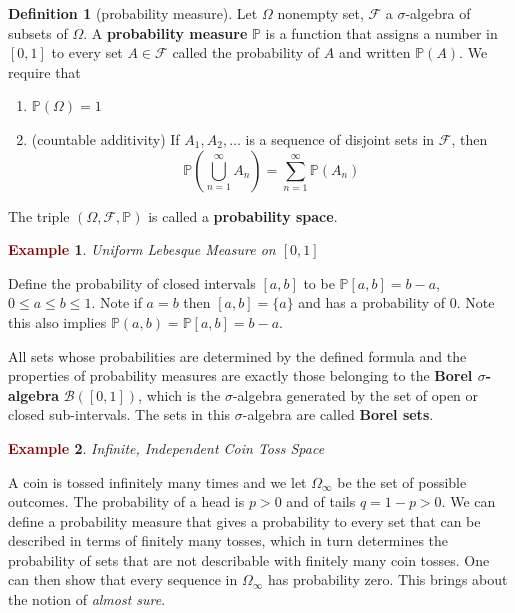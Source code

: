 \documentclass[11pt]{article}
\theoremstyle{definition}
\theoremstyle{definition}
\theoremstyle{definition}
\newtheorem{definition}{\textcolor{OliveGreen}{Definition}}
\newtheorem{ex}{\textcolor{Maroon}{Example}}
\theoremstyle{remark}
\begin{document}
\begin{definition}[probability measure]
    Let $\Omega$ nonempty set, $\mathcal{F}$ a $\sigma$-algebra of subsets of $\Omega$. A \textbf{probability measure} $\mathbb{P}$
    is a function that assigns a number in $[0, 1]$ to every set $A \in \mathcal{F}$ called the probability of 
    $A$ and written $\mathbb{P}(A)$. We require that
    \begin{enumerate}
        \item $\mathbb{P}(\Omega) = 1$
        \item (countable additivity) If $A_1, A_2, \dots$ is a sequence of disjoint sets in $\mathcal{F}$, then
        \[
            \mathbb{P}\left(\bigcup_{n = 1}^\infty A_n\right) = \sum_{n = 1}^\infty \mathbb{P}(A_n)
        \]    
    \end{enumerate}
    The triple $(\Omega, \mathcal{F}, \mathbb{P})$ is called a \textbf{probability space}. 
\end{definition}

\begin{ex}{\textit{Uniform Lebesque Measure on $[0, 1]$}}
    
    Define the probability of closed intervals $[a,b]$ to be $\mathbb{P}[a,b] = b - a$, $0 \leq a \leq b \leq 1$.
    Note if $a = b$ then $[a, b] = \{a\}$ and has a probability of $0$. Note this also implies 
    $\mathbb{P}(a, b) = \mathbb{P}[a,b] = b - a$. 

    All sets whose probabilities are determined by the defined formula and the properties of probability measures are exactly those
    belonging to the \textbf{Borel $\sigma$-algebra} $\mathcal{B}([0, 1])$, which is the $\sigma$-algebra generated by the set of open or closed sub-intervals. 
    The sets in this $\sigma$-algebra are called \textbf{Borel sets}.
\end{ex}

\begin{ex}{\textit{Infinite, Independent Coin Toss Space}}

    A coin is tossed infinitely many times and we let $\Omega_{\infty}$ be the set of possible outcomes. The probability
    of a head is $p > 0$ and of tails $q = 1 - p > 0$. We can define a probability measure that gives a probability to every set
    that can be described in terms of finitely many tosses, which in turn determines the probability of sets that are
    not describable with finitely many coin tosses. One can then show that every sequence in $\Omega_\infty$ 
    has probability zero. This brings about the notion of \textit{almost sure}. 
\end{ex}
\end{document}
